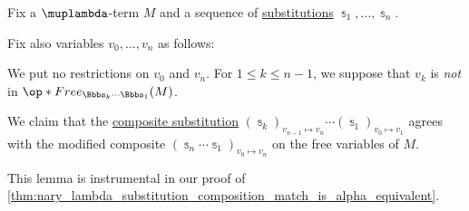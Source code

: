 \begin{lemma}\label{thm:composition_of_lambda_substitutions_lemma}
  Fix a \( \muplambda \)-term \( M \) and a sequence of \hyperref[def:atomic_lambda_term_substitution]{substitutions} \( \Bbbs_1, \ldots, \Bbbs_n \).

  Fix also variables \( v_0, \ldots, v_n \) as follows:
  \begin{thmenum}
     We put no restrictions on \( v_0 \) and \( v_n \).
     For \( 1 \leq k \leq n - 1 \), we suppose that \( v_k \) is \emph{not} in \( \op*{Free}_{\Bbbs_k \cdots \Bbbs_1}(M) \).
  \end{thmenum}

  We claim that the \hyperref[def:lambda_substitution_composition]{composite substitution} \( (\Bbbs_k)_{v_{n-1} \mapsto v_n} \cdots (\Bbbs_1)_{v_0 \mapsto v_1} \) agrees with the modified composite \( (\Bbbs_n \cdots \Bbbs_1)_{v_0 \mapsto v_n} \) on the free variables of \( M \).
\end{lemma}
\begin{comments}
  \item This lemma is instrumental in our proof of \cref{thm:nary_lambda_substitution_composition_match_is_alpha_equivalent}.
\end{comments}
